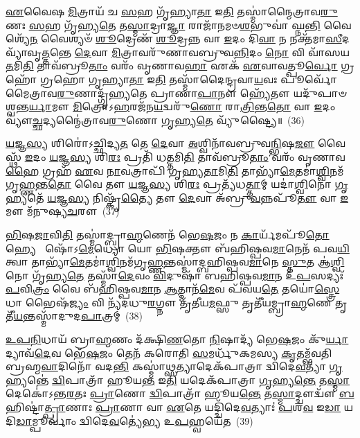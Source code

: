 \-\ul{𑌏}\-𑌵𑍈𑌷 \ul{𑌮𑌿}\-𑌤𑍍𑌰𑌾𑌯᳴ 𑌚 \ul{𑌸}\-𑌹 𑌗𑍃᳴𑌹𑍍𑌯𑌾\-\ul{𑌤𑌾} 𑌇\-\ul{𑌤𑌿} 𑌤𑌸𑍍𑌮𑌾॑𑌨𑍍𑌮𑍈𑌤𑍍𑌰𑌾𑌵\-\ul{𑌰𑍁}\-𑌣𑌃 \ul{𑌸}\-𑌹 𑌗𑍃᳴𑌹𑍍𑌯\-\ul{𑌤𑍇} 𑌤\-\ul{𑌸𑍍𑌮𑌾}\-𑌦𑍍𑌰𑌾\-\ul{𑌜𑍍𑌞𑌾} 𑌰𑌾𑌜𑌾᳴𑌨𑌮𑍞\-\ul{𑌶}\-𑌭𑍁𑌵𑌾॑ 𑌘𑍍𑌨\-\ul{𑌨𑍍𑌤𑌿} 𑌵𑍈𑌶𑍍𑌯𑍇᳴\-\ul{𑌨} 𑌵𑍈𑌶𑍍𑌯𑍞᳴ \ul{𑌶𑍂}\-𑌦𑍍𑌰𑍇𑌣᳴ \ul{𑌶𑍂}\-𑌦𑍍𑌰𑌨𑍍𑌨 𑌵𑌾 \ul{𑌇}\-𑌦𑌂 𑌦𑌿\-\ul{𑌵𑌾} 𑌨 𑌨𑌕𑍍𑌤᳴𑌮𑌾\-\ul{𑌸𑍀}\-𑌦𑌵𑍍𑌯𑌾᳴𑌵𑍃\-\ul{𑌤𑍍𑌤}\-𑌨𑍍𑌤𑍇 \ul{𑌦𑍇}\-𑌵𑌾 \ul{𑌮𑌿}\-𑌤𑍍𑌰𑌾𑌵𑌰𑍁᳴𑌣𑌾𑌵𑌬𑍍𑌰𑍁𑌵\-\ul{𑌨𑍍𑌨𑌿}\-𑌦𑌂 \ul{𑌨𑍋} 𑌵𑌿 𑌵𑌾᳴𑌸𑌯\-\ul{𑌤}\-𑌮𑌿\-\ul{𑌤𑌿} 𑌤𑌾𑌵᳴𑌬𑍍𑌰𑍂\-\ul{𑌤𑌾𑌂} 𑌵𑌰𑌂᳴ 𑌵𑍃𑌣𑌾𑌵\-\ul{𑌹𑌾} 𑌏𑌕᳴ \ul{𑌏}\-𑌵𑌾𑌵𑌤𑍍𑌪𑍂\-\ul{𑌰𑍍𑌵𑍋} 𑌗𑍍𑌰𑌹𑍋᳴ 𑌗𑍍𑌰𑌹𑍋 𑌗𑍃𑌹𑍍𑌯𑌾\-\ul{𑌤𑌾} 𑌇\-\ul{𑌤𑌿} 𑌤𑌸𑍍𑌮𑌾᳴𑌦𑍈𑌨𑍍𑌦𑍍𑌰𑌵𑌾\-\ul{𑌯}\-𑌵𑌃 𑌪𑍂𑌰𑍍𑌵𑍋᳴ 𑌮𑍈𑌤𑍍𑌰𑌾𑌵\-\ul{𑌰𑍁}\-𑌣𑌾𑌦𑍍𑌗𑍃᳴𑌹𑍍𑌯𑌤𑍇 𑌪𑍍𑌰𑌾𑌣𑌾\-\ul{𑌪𑌾}\-𑌨𑍗 𑌹𑍍𑌯𑍇᳴𑌤𑍗 𑌯𑌦𑍁᳴𑌪𑌾𑍞𑌶𑍍𑌵𑌨𑍍𑌤\-\ul{𑌰𑍍𑌯𑌾}\-𑌮𑍗 \ul{𑌮𑌿}\-𑌤𑍍𑌰𑍋\-𑌽\-\ul{𑌹}\-𑌰𑌜᳴𑌨\-\ul{𑌯}\-𑌦𑍍𑌵𑌰𑍁᳴\-\ul{𑌣𑍋} 𑌰𑌾\-\ul{𑌤𑍍𑌰𑌿}\-𑌨𑍍𑌤\-\ul{𑌤𑍋} 𑌵𑌾 \ul{𑌇}\-𑌦𑌂 𑌵𑍍𑌯𑍗॑\-\ul{𑌚𑍍𑌛}\-𑌦𑍍𑌯𑌨𑍍𑌮𑍈॑𑌤𑍍𑌰𑌾𑌵\-\ul{𑌰𑍁}\-𑌣𑍋 \ul{𑌗𑍃}\-𑌹𑍍𑌯\-\ul{𑌤𑍇} 𑌵𑍍𑌯𑍁᳴𑌷𑍍𑌟𑍍𑌯𑍈॥~(36)

{\anuvakamend[{\-\ul{𑌏}\-𑌷 𑌚𑍈॑𑌨𑍍𑌦𑍍𑌰𑌵𑌾\-\ul{𑌯}\-𑌵𑍋 𑌦𑍍𑌵𑌾𑌵𑌿𑍞᳴𑌶𑌤𑌿𑌶𑍍𑌚}]}%

\-\ul{𑌯}\-𑌜𑍍𑌞\-\ul{𑌸𑍍𑌯} 𑌶𑌿𑌰𑍋॑\-𑌽𑌚𑍍𑌛𑌿𑌦𑍍𑌯\-\ul{𑌤} 𑌤𑍇 \ul{𑌦𑍇}\-𑌵𑌾 \ul{𑌅}\-𑌶𑍍𑌵𑌿𑌨𑌾᳴𑌵𑌬𑍍𑌰𑍁𑌵\-\ul{𑌨𑍍𑌭𑌿}\-𑌷\-\ul{𑌜𑍗} 𑌵𑍈 𑌸𑍍𑌥᳴ \ul{𑌇}\-𑌦𑌂 \ul{𑌯}\-𑌜𑍍𑌞\-\ul{𑌸𑍍𑌯} 𑌶𑌿\-\ul{𑌰𑌃} 𑌪𑍍𑌰𑌤𑌿᳴ 𑌧\-\ul{𑌤𑍍𑌤}\-𑌮𑌿\-\ul{𑌤𑌿} 𑌤𑌾𑌵᳴𑌬𑍍𑌰𑍂\-\ul{𑌤𑌾𑌂} 𑌵𑌰𑌂᳴ 𑌵𑍃𑌣𑌾𑌵\-\ul{𑌹𑍈} 𑌗𑍍𑌰𑌹᳴ \ul{𑌏}\-𑌵 \ul{𑌨𑌾}\-𑌵𑌤𑍍𑌰𑌾𑌪𑌿᳴ 𑌗𑍃𑌹𑍍𑌯\-\ul{𑌤𑌾}\-𑌮𑌿\-\ul{𑌤𑌿} 𑌤𑌾𑌭𑍍𑌯𑌾᳴\-\ul{𑌮𑍇}\-𑌤𑌮𑌾॑\-\ul{𑌶𑍍𑌵𑌿}\-𑌨𑌮᳴𑌗𑍃\-\ul{𑌹𑍍𑌣}\-𑌨𑍍𑌤\-\ul{𑌤𑍋} 𑌵𑍈 𑌤𑍗 \ul{𑌯}\-𑌜𑍍𑌞\-\ul{𑌸𑍍𑌯} 𑌶𑌿\-\ul{𑌰𑌃} 𑌪𑍍𑌰𑌤𑍍𑌯᳴𑌧\-\ul{𑌤𑍍𑌤𑌾}\-𑌮𑍍 𑌯𑌦𑌾॑\-\ul{𑌶𑍍𑌵𑌿}\-𑌨𑍋 \ul{𑌗𑍃}\-𑌹𑍍𑌯𑌤𑍇᳴ \ul{𑌯}\-𑌜𑍍𑌞\-\ul{𑌸𑍍𑌯} 𑌨𑌿𑌷𑍍𑌕𑍃᳴\-\ul{𑌤𑍍𑌯𑍈} 𑌤𑍗 \ul{𑌦𑍇}\-𑌵𑌾 𑌅᳴𑌬𑍍𑌰𑍁\-\ul{𑌵}\-𑌨𑍍𑌨𑌪𑍂᳴\-\ul{𑌤𑍗} 𑌵𑌾 \ul{𑌇}\-𑌮𑍗 𑌮᳴𑌨𑍁𑌷𑍍𑌯\-\ul{𑌚}\-𑌰𑍗~(37)

\-\ul{𑌭𑌿}\-𑌷\-\ul{𑌜𑌾}\-𑌵𑌿\-\ul{𑌤𑌿} 𑌤𑌸𑍍𑌮𑌾॑𑌦𑍍𑌬𑍍𑌰𑌾\-\ul{𑌹𑍍𑌮}\-𑌣𑍇𑌨᳴ 𑌭𑍇\-\ul{𑌷}\-𑌜𑌂 𑌨 \ul{𑌕𑌾}\-𑌰𑍍𑌯᳴𑌮𑌪𑍂᳴\-\ul{𑌤𑍋} 𑌹𑍍𑌯𑍇  𑌷𑍋᳴\-𑌽\-\ul{𑌮𑍇}\-𑌧𑍍𑌯𑍋 𑌯𑍋 \ul{𑌭𑌿}\-𑌷𑌕𑍍𑌤𑍗 𑌬᳴𑌹𑌿𑌷𑍍𑌪𑌵\-\ul{𑌮𑌾}\-𑌨𑍇𑌨᳴ 𑌪𑌵\-\ul{𑌯𑌿}\-𑌤𑍍𑌵𑌾 𑌤𑌾𑌭𑍍𑌯𑌾᳴\-\ul{𑌮𑍇}\-𑌤𑌮𑌾॑\-\ul{𑌶𑍍𑌵𑌿}\-𑌨𑌮᳴𑌗𑍃\-\ul{𑌹𑍍𑌣}\-𑌨𑍍𑌤𑌸𑍍𑌮𑌾॑𑌦𑍍𑌬𑌹𑌿𑌷𑍍𑌪𑌵\-\ul{𑌮𑌾}\-𑌨𑍇 \ul{𑌸𑍍𑌤𑍁}\-𑌤 𑌆॑\-\ul{𑌶𑍍𑌵𑌿}\-𑌨𑍋 𑌗𑍃᳴𑌹𑍍𑌯\-\ul{𑌤𑍇} 𑌤𑌸𑍍𑌮𑌾᳴\-\ul{𑌦𑍇}\-𑌵𑌂 \ul{𑌵𑌿}\-𑌦𑍁𑌷𑌾᳴ 𑌬𑌹𑌿𑌷𑍍𑌪𑌵\-\ul{𑌮𑌾}\-𑌨 𑌉᳴\-\ul{𑌪}\-𑌸𑌦𑍍𑌯𑌃᳴ \ul{𑌪}\-𑌵𑌿\-\ul{𑌤𑍍𑌰𑌂} 𑌵𑍈 𑌬᳴𑌹𑌿𑌷𑍍𑌪𑌵\-\ul{𑌮𑌾}\-𑌨 \ul{𑌆}\-𑌤𑍍𑌮𑌾𑌨᳴\-\ul{𑌮𑍇}\-𑌵 𑌪᳴𑌵𑌯\-\ul{𑌤𑍇} 𑌤𑌯𑍋॑\-\ul{𑌸𑍍𑌤𑍍𑌰𑍇}\-𑌧𑌾 𑌭𑍈𑌷᳴\-\ul{𑌜𑍍𑌯𑌂} 𑌵𑌿 𑌨𑍍𑌯᳴𑌦𑌧𑍁\-\ul{𑌰}\-𑌗𑍍𑌨𑍗 𑌤𑍃᳴𑌤𑍀𑌯\-\ul{𑌮}\-𑌫𑍍𑌸𑍁 𑌤𑍃𑌤𑍀᳴𑌯𑌮𑍍𑌬𑍍𑌰𑌾\-\ul{𑌹𑍍𑌮}\-𑌣𑍇 𑌤𑍃𑌤𑍀᳴\-\ul{𑌯}\-𑌨𑍍𑌤𑌸𑍍𑌮𑌾᳴𑌦𑍁𑌦\-\ul{𑌪𑌾}\-𑌤𑍍𑌰𑌮𑍍~(38)

\-\ul{𑌉}\-\-\ul{𑌪}\-\-\ul{𑌨𑌿}\-𑌧𑌾𑌯᳴ 𑌬𑍍𑌰𑌾\-\ul{𑌹𑍍𑌮}\-𑌣𑌂 𑌦᳴𑌕𑍍𑌷𑌿\-\ul{𑌣}\-𑌤𑍋 \ul{𑌨𑌿}\-𑌷𑌾𑌦𑍍𑌯᳴ 𑌭𑍇\-\ul{𑌷}\-𑌜𑌂 𑌕𑍁᳴\-\ul{𑌰𑍍𑌯𑌾}\-𑌦𑍍𑌯𑌾𑌵᳴\-\ul{𑌦𑍇}\-𑌵 𑌭𑍇᳴\-\ul{𑌷}\-𑌜𑌂 𑌤𑍇𑌨᳴ 𑌕𑌰𑍋𑌤𑌿 \ul{𑌸}\-𑌮𑌰𑍍𑌧𑍁᳴𑌕𑌮𑌸𑍍𑌯 \ul{𑌕𑍃}\-𑌤𑌮𑍍𑌭᳴𑌵𑌤𑌿 𑌬𑍍𑌰𑌹𑍍𑌮\-\ul{𑌵𑌾}\-𑌦𑌿𑌨𑍋᳴ 𑌵𑌦\-\ul{𑌨𑍍𑌤𑌿} 𑌕𑌸𑍍𑌮𑌾॑\-\ul{𑌥𑍍𑌸}\-𑌤𑍍𑌯𑌾𑌦𑍇𑌕᳴𑌪𑌾𑌤𑍍𑌰𑌾 𑌦𑍍𑌵𑌿𑌦𑍇\-\ul{𑌵}\-𑌤𑍍𑌯𑌾᳴ \ul{𑌗𑍃}\-𑌹𑍍𑌯𑌨𑍍𑌤𑍇॑ \ul{𑌦𑍍𑌵𑌿}\-𑌪𑌾𑌤𑍍𑌰𑌾᳴ 𑌹𑍂𑌯\-\ul{𑌨𑍍𑌤} 𑌇\-\ul{𑌤𑌿} 𑌯𑌦𑍇𑌕᳴𑌪𑌾𑌤𑍍𑌰𑌾 \ul{𑌗𑍃}\-𑌹𑍍𑌯\-\ul{𑌨𑍍𑌤𑍇} 𑌤\-\ul{𑌸𑍍𑌮𑌾}\-𑌦𑍇𑌕𑍋॑\-𑌽𑌨𑍍𑌤\-\ul{𑌰}\-𑌤𑌃 \ul{𑌪𑍍𑌰𑌾}\-𑌣𑍋 \ul{𑌦𑍍𑌵𑌿}\-𑌪𑌾𑌤𑍍𑌰𑌾᳴ 𑌹𑍂𑌯\-\ul{𑌨𑍍𑌤𑍇} 𑌤\-\ul{𑌸𑍍𑌮𑌾}\-𑌦𑍍𑌦𑍍𑌵𑍗𑌦𑍍𑌵𑍗᳴ \ul{𑌬}\-𑌹𑌿𑌷𑍍𑌟𑌾॑\-\ul{𑌤𑍍𑌪𑍍𑌰𑌾}\-𑌣𑌾𑌃 \ul{𑌪𑍍𑌰𑌾}\-𑌣𑌾 𑌵𑌾 \ul{𑌏}\-𑌤𑍇 𑌯𑌦𑍍𑌦𑍍𑌵𑌿᳴𑌦𑍇\-\ul{𑌵}\-𑌤𑍍𑌯𑌾𑌃॑ \ul{𑌪}\-𑌶\-\ul{𑌵} 𑌇\-\ul{𑌡𑌾} 𑌯𑌦𑌿\-\ul{𑌡𑌾}\-𑌮𑍍𑌪𑍂𑌰𑍍𑌵𑌾𑌂॑ 𑌦𑍍𑌵𑌿𑌦𑍇\-\ul{𑌵}\-𑌤𑍍𑌯𑍇॑𑌭𑍍𑌯 𑌉\-\ul{𑌪}\-𑌹𑍍𑌵𑌯𑍇᳴𑌤~(39)

